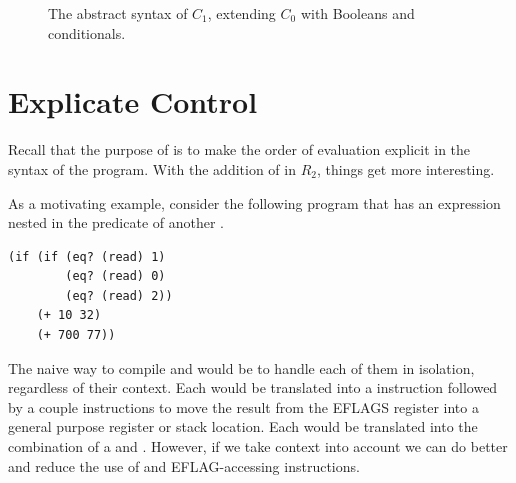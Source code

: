 \documentclass[11pt]{book}
\newcommand{\gray}[1]{{\color{lightgray} #1}}
\begin{document}
\begin{figure}[tp]
\fbox{
\begin{minipage}{0.96\textwidth}
\small    
\[
\begin{array}{lcl}
\Atm &::=& \gray{\INT{\Int} \mid \VAR{\Var}} \mid \BOOL{\itm{bool}} \\
\itm{cmp} &::= & \key{eq?} \mid \key{<}  \\
\Exp &::= & \gray{\Atm \mid \READ{} \mid \NEG{\Atm} }\\
     &\mid& \gray{ \ADD{\Atm}{\Atm} } 
     \mid \UNIOP{\key{not}}{\Atm} \\
     &\mid& \BINOP{\itm{cmp}}{\Atm}{\Atm} \\
\Stmt &::=& \gray{ \ASSIGN{\Var}{\Exp} } \\
\Tail &::= & \gray{\RETURN{\Exp} \mid \SEQ{\Stmt}{\Tail} } \\
      &\mid& \GOTO{\itm{label}} \mid \IFSTMT{\key{(}\itm{cmp}\,\Atm\,\Atm\key{)}}{\GOTO{\itm{label}}}{\GOTO{\itm{label}}} \\
C_1 & ::= & \gray{\PROGRAM{\itm{info}}{\CFG{\key{(}\itm{label}\,\key{.}\,\Tail\key{)}^{+}}}}
\end{array}
\]
\end{minipage}
}
\caption{The abstract syntax of $C_1$, extending $C_0$ with Booleans and conditionals.}
\label{fig:c1-syntax}
\end{figure}


\section{Explicate Control}
\label{sec:explicate-control-r2}

Recall that the purpose of  is to make the
order of evaluation explicit in the syntax of the program.  With the
addition of  in $R_2$, things get more interesting.

As a motivating example, consider the following program that has an
 expression nested in the predicate of another .
\begin{center}
\begin{minipage}{0.96\textwidth}
\begin{lstlisting}
(if (if (eq? (read) 1)
        (eq? (read) 0)
        (eq? (read) 2))
    (+ 10 32)
    (+ 700 77))
\end{lstlisting}
\end{minipage}
\end{center}
%
The naive way to compile  and  would be to handle
each of them in isolation, regardless of their context.  Each
 would be translated into a  instruction followed
by a couple instructions to move the result from the EFLAGS register
into a general purpose register or stack location. Each  would
be translated into the combination of a  and .
However, if we take context into account we can do better and reduce
the use of  and EFLAG-accessing instructions.
\end{document}
